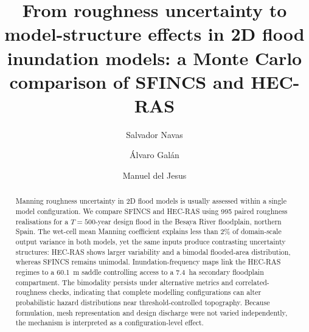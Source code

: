 \documentclass[a4paper,fleqn]{cas-sc}
\begin{document}
\let\WriteBookmarks\relax
\def\floatpagepagefraction{1}
\def\textpagefraction{.001}


\title[mode=title]{From roughness uncertainty to model-structure effects in 2D flood inundation models: a Monte Carlo comparison of SFINCS and HEC-RAS}

\author[1]{Salvador Navas}
\cormark[1]


\author[2]{{\'A}lvaro Gal\'an}


\author[1]{Manuel {del Jesus}}


\begin{abstract}
Manning roughness uncertainty in 2D flood models is usually assessed within a
single model configuration. We compare SFINCS and HEC-RAS using 995 paired
roughness realisations for a $T=500$-year design flood in the Besaya River
floodplain, northern Spain. The wet-cell mean Manning coefficient explains less
than 2\% of domain-scale output variance in both models, yet the same inputs
produce contrasting uncertainty structures: HEC-RAS shows larger variability
and a bimodal flooded-area distribution, whereas SFINCS remains unimodal.
Inundation-frequency maps link the HEC-RAS regimes to a 60.1~m saddle
controlling access to a 7.4~ha secondary floodplain compartment. The bimodality
persists under alternative metrics and correlated-roughness checks, indicating
that complete modelling configurations can alter probabilistic hazard
distributions near threshold-controlled topography. Because formulation, mesh
representation and design discharge were not varied independently, the
mechanism is interpreted as a configuration-level effect.
\end{abstract}
\end{document}
